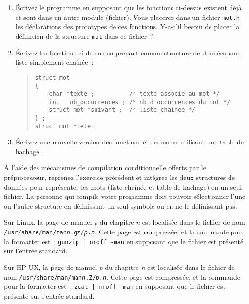 \begin {enumerate}
    \item Écrivez le programme en supposant que les fonctions
	ci-dessus existent déjà et sont dans un autre module (fichier).
	Vous placerez dans un fichier {\tt mot.h} les déclarations des
	prototypes de ces fonctions.  Y-a-t'il besoin de placer la
	définition de la structure {\tt mot} dans ce fichier~?

    \item Écrivez les fonctions ci-dessus en prenant comme structure
	de données une liste simplement chaînée~:

\begin {quote}
\small
\begin {verbatim}
struct mot
{
    char *texte ;          /* texte associe au mot */
    int   nb_occurrences ; /* nb d'occurrences du mot */
    struct mot *suivant ;  /* liste chainee */
} ;
struct mot *tete ;
\end{verbatim}
\end {quote}

    \item Écrivez une nouvelle version des fonctions ci-dessus en
	utilisant une table de hachage.

\end {enumerate}


\question

\`A l'aide des mécanismes de compilation conditionnelle offerts par le
préprocesseur, reprenez l'exercice précédent et intégrez les deux
structures de données pour représenter les mots (liste chaînée et table
de hachage) en un seul fichier. La personne qui compile votre programme
doit pouvoir sélectionner l'une ou l'autre structure en définissant un
seul symbole ou en ne le définissant pas.


\question

Sur Linux, la page de manuel {\em p} du chapitre {\em n} est localisée
dans le fichier de nom
{\tt /usr/share/man/man{\em n}.gz/{\em p}.{\em n}}. Cette page est
compressée, et la commande pour la formatter est~:
\verb:gunzip | nroff -man: en supposant que le fichier est présenté sur
l'entrée standard.

Sur HP-UX, la page de manuel {\em p} du chapitre {\em n} est localisée
dans le fichier de nom
{\tt /usr/share/man/man{\em n}.Z/{\em p}.{\em n}}. Cette page est
compressée, et la commande pour la formatter est~:
\verb:zcat | nroff -man: en supposant que le fichier est présenté sur
l'entrée standard.

